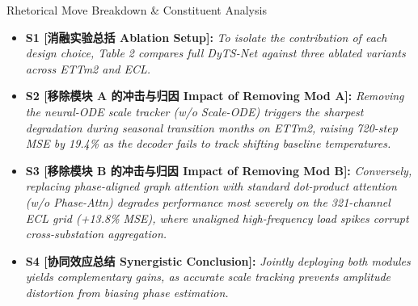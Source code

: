 \begin{TipBox}{Rhetorical Move Breakdown \& Constituent Analysis}
\begin{itemize}[leftmargin=1.5em]
  \item \textbf{S1 [消融实验总括 Ablation Setup]:} \textit{To isolate the contribution of each design choice, Table 2 compares full DyTS-Net against three ablated variants across ETTm2 and ECL.}\par{}
  \item \textbf{S2 [移除模块 A 的冲击与归因 Impact of Removing Mod A]:} \textit{Removing the neural-ODE scale tracker (w/o Scale-ODE) triggers the sharpest degradation during seasonal transition months on ETTm2, raising 720-step MSE by 19.4\% as the decoder fails to track shifting baseline temperatures.}\par{}
  \item \textbf{S3 [移除模块 B 的冲击与归因 Impact of Removing Mod B]:} \textit{Conversely, replacing phase-aligned graph attention with standard dot-product attention (w/o Phase-Attn) degrades performance most severely on the 321-channel ECL grid (+13.8\% MSE), where unaligned high-frequency load spikes corrupt cross-substation aggregation.}\par{}
  \item \textbf{S4 [协同效应总结 Synergistic Conclusion]:} \textit{Jointly deploying both modules yields complementary gains, as accurate scale tracking prevents amplitude distortion from biasing phase estimation.}\par{}
\end{itemize}
\end{TipBox}
\medskip
